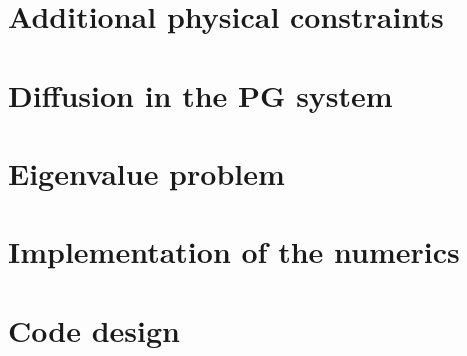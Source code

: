 \documentclass[a4paper, 11pt]{report}
\begin{document}
\chapter{Additional physical constraints}




\chapter{Diffusion in the PG system}




\chapter{Eigenvalue problem}




\chapter{Implementation of the numerics}









\clearpage

\appendix

\chapter{Code design}



\clearpage

% 



\clearpage

\printbibliography
\end{document}
